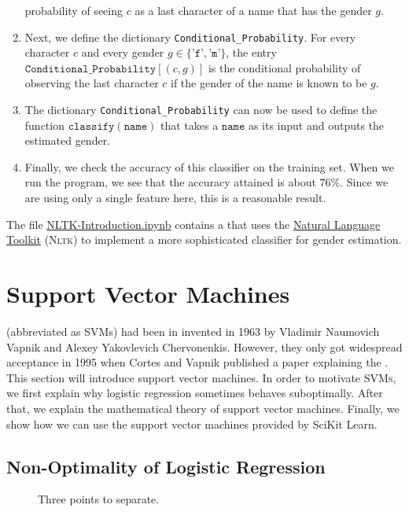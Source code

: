 \begin{enumerate}
      probability of seeing $c$ as a last character of a name that has the gender $g$. 
\item Next, we define the dictionary \texttt{Conditional\_Probability}.  For every character $c$ and every
      gender $g \in \{\texttt{'f'}, \texttt{'m'}\}$, the entry $\texttt{Conditional\_Probability}[(c,g)]$ is the
      conditional probability of observing the last character $c$ if the gender of the name is known to be $g$. 
\item The dictionary \texttt{Conditional\_Probability} can now be used to define the function
      $\texttt{classify}(\texttt{name})$ that takes a $\texttt{name}$ as its input and outputs the estimated
      gender.
\item Finally, we check the accuracy of this classifier on the training set.  When we run the program, we see
      that the accuracy attained is about $76\%$.  Since we are using only a single feature here, this is a
      reasonable result.
\end{enumerate}
The file
\href{https://github.com/karlstroetmann/Artificial-Intelligence/blob/master/Python/NLTK-Introduction.ipynb}{NLTK-Introduction.ipynb}
contains a  that uses the \href{https://www.nltk.org}{Natural Language Toolkit}
(\textsc{Nltk}) to implement a more sophisticated classifier for gender estimation.

\section{Support Vector Machines}
 (abbreviated as \textsc{SVM}s) had been in invented in 1963 by Vladimir
Naumovich Vapnik and Alexey Yakovlevich Chervonenkis.   However, they only got widespread acceptance in 1995
when Cortes and Vapnik published a paper explaining the  \cite{cortes:1995}.  This section will introduce
support vector machines.  In order to motivate \textsc{SVMs}, we first explain why logistic regression
sometimes behaves suboptimally.  After that, we explain the mathematical theory of support vector machines.
Finally, we show how we can use the support vector machines provided by SciKit Learn.

\subsection{Non-Optimality of Logistic Regression}

\begin{figure}[!th]
\caption{Three points to separate.}
\label{fig:largest-margin.pdf}
\end{figure}

